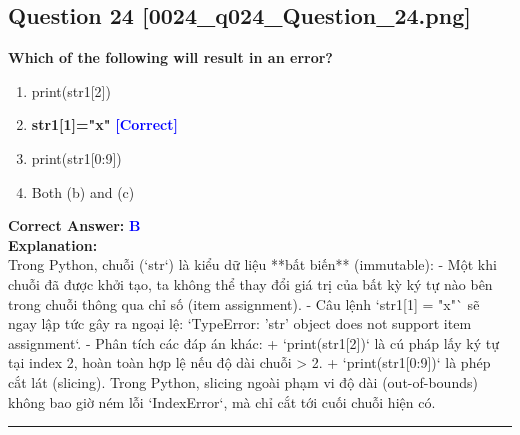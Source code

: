 \documentclass[11pt,a4paper]{article}
\begin{document}
\begin{minipage}{\textwidth}
\subsection*{Question 24 \quad \footnotesize{[0024_q024_Question_24.png]}}
\noindent \textbf{Which of the following will result in an error?}

\begin{enumerate}[label=\Alph*.]
    \item print(str1[2])
    \item \textbf{str1[1]="x"} \hfill \textcolor{blue}{\textbf{[Correct]}}
    \item print(str1[0:9])
    \item Both (b) and (c)
\end{enumerate}

\noindent \textbf{Correct Answer:} \textcolor{blue}{\textbf{B}} \\[4pt]
\noindent \textbf{Explanation:}\\
Trong Python, chuỗi (`str`) là kiểu dữ liệu **bất biến** (immutable):\newline
- Một khi chuỗi đã được khởi tạo, ta không thể thay đổi giá trị của bất kỳ ký tự nào bên trong chuỗi thông qua chỉ số (item assignment).\newline
- Câu lệnh `str1[1] = "x"` sẽ ngay lập tức gây ra ngoại lệ: `TypeError: 'str' object does not support item assignment`.\newline
- Phân tích các đáp án khác:\newline
  + `print(str1[2])` là cú pháp lấy ký tự tại index 2, hoàn toàn hợp lệ nếu độ dài chuỗi > 2.\newline
  + `print(str1[0:9])` là phép cắt lát (slicing). Trong Python, slicing ngoài phạm vi độ dài (out-of-bounds) không bao giờ ném lỗi `IndexError`, mà chỉ cắt tới cuối chuỗi hiện có.
\end{minipage}
\vspace{0.8cm}
\hrule
\vspace{0.5cm}
\end{document}
